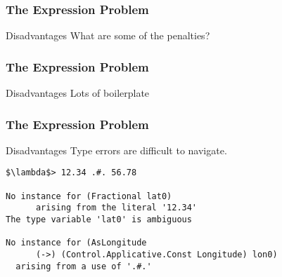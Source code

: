 \begin{frame}[fragile]
\frametitle{The Expression Problem}
\begin{block}{Disadvantages}
What are some of the penalties?
\end{block}
\end{frame}

\begin{frame}[fragile]
\frametitle{The Expression Problem}
\begin{block}{Disadvantages}
Lots of boilerplate
\end{block}
\end{frame}

\begin{frame}[fragile]
\frametitle{The Expression Problem}
\begin{block}{Disadvantages}
Type errors are difficult to navigate.
\begin{lstlisting}[style=haskell,mathescape]
$\lambda$> 12.34 .#. 56.78

No instance for (Fractional lat0)
      arising from the literal '12.34'
The type variable 'lat0' is ambiguous

No instance for (AsLongitude
      (->) (Control.Applicative.Const Longitude) lon0)
  arising from a use of '.#.'
\end{lstlisting}
\end{block}
\end{frame}

